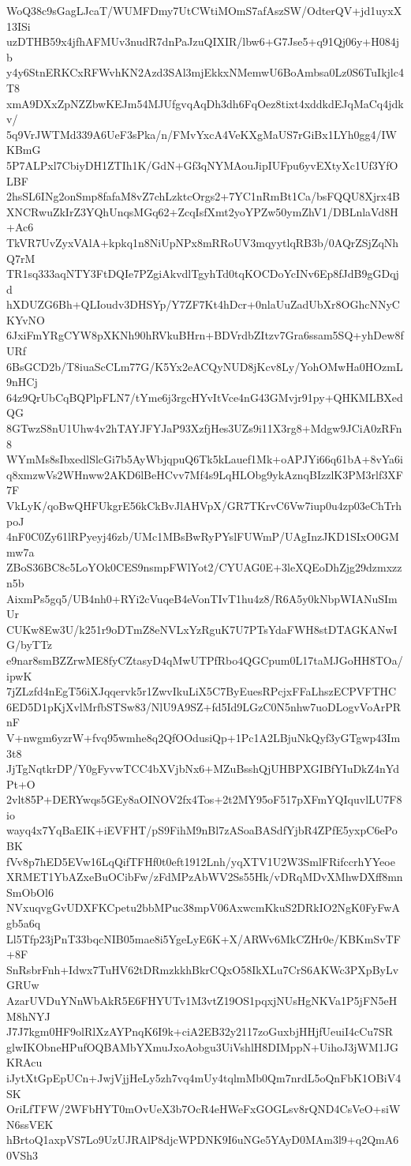 WoQ38c9sGagLJcaT/WUMFDmy7UtCWtiMOmS7afAszSW/OdterQV+jd1uyxX13ISi
uzDTHB59x4jfhAFMUv3nudR7dnPaJzuQIXIR/lbw6+G7Jse5+q91Qj06y+H084jb
y4y6StnERKCxRFWvhKN2Azd3SAl3mjEkkxNMemwU6BoAmbsa0Lz0S6TuIkjlc4T8
xmA9DXxZpNZZbwKEJm54MJUfgvqAqDh3dh6FqOez8tixt4xddkdEJqMaCq4jdkv/
5q9VrJWTMd339A6UeF3sPka/n/FMvYxcA4VeKXgMaUS7rGiBx1LYh0gg4/IWKBmG
5P7ALPxl7CbiyDH1ZTIh1K/GdN+Gf3qNYMAouJipIUFpu6yvEXtyXc1Uf3YfOLBF
2hsSL6INg2onSmp8fafaM8vZ7chLzktcOrgs2+7YC1nRmBt1Ca/bsFQQU8Xjrx4B
XNCRwuZkIrZ3YQhUnqsMGq62+ZcqIsfXmt2yoYPZw50ymZhV1/DBLnlaVd8H+Ac6
TkVR7UvZyxVAlA+kpkq1n8NiUpNPx8mRRoUV3mqyytlqRB3b/0AQrZSjZqNhQ7rM
TR1sq333aqNTY3FtDQIe7PZgiAkvdlTgyhTd0tqKOCDoYcINv6Ep8fJdB9gGDqjd
hXDUZG6Bh+QLIoudv3DHSYp/Y7ZF7Kt4hDcr+0nlaUuZadUbXr8OGhcNNyCKYvNO
6JxiFmYRgCYW8pXKNh90hRVkuBHrn+BDVrdbZItzv7Gra6ssam5SQ+yhDew8fURf
6BsGCD2b/T8iuaScCLm77G/K5Yx2eACQyNUD8jKcv8Ly/YohOMwHa0HOzmL9nHCj
64z9QrUbCqBQPlpFLN7/tYme6j3rgcHYvItVce4nG43GMvjr91py+QHKMLBXedQG
8GTwzS8nU1Uhw4v2hTAYJFYJaP93XzfjHes3UZs9i11X3rg8+Mdgw9JCiA0zRFn8
WYmMs8sIbxedlSlcGi7b5AyWbjqpuQ6Tk5kLauef1Mk+oAPJYi66q61bA+8vYa6i
q8xmzwVs2WHnww2AKD6lBeHCvv7Mf4s9LqHLObg9ykAznqBIzzlK3PM3rlf3XF7F
VkLyK/qoBwQHFUkgrE56kCkBvJlAHVpX/GR7TKrvC6Vw7iup0u4zp03eChTrhpoJ
4nF0C0Zy61lRPyeyj46zb/UMc1MBsBwRyPYslFUWmP/UAgInzJKD1SIxO0GMmw7a
ZBoS36BC8c5LoYOk0CES9nsmpFWlYot2/CYUAG0E+3leXQEoDhZjg29dzmxzzn5b
AixmPs5gq5/UB4nh0+RYi2cVuqeB4eVonTIvT1hu4z8/R6A5y0kNbpWIANuSImUr
CUKw8Ew3U/k251r9oDTmZ8eNVLxYzRguK7U7PTsYdaFWH8stDTAGKANwIG/byTTz
e9nar8smBZZrwME8fyCZtasyD4qMwUTPfRbo4QGCpum0L17taMJGoHH8TOa/ipwK
7jZLzfd4nEgT56iXJqqervk5r1ZwvIkuLiX5C7ByEuesRPcjxFFaLhszECPVFTHC
6ED5D1pKjXvlMrfbSTSw83/NlU9A9SZ+fd5Id9LGzC0N5nhw7uoDLogvVoArPRnF
V+nwgm6yzrW+fvq95wmhe8q2QfOOdusiQp+1Pc1A2LBjuNkQyf3yGTgwp43Im3t8
JjTgNqtkrDP/Y0gFyvwTCC4bXVjbNx6+MZuBsshQjUHBPXGIBfYIuDkZ4nYdPt+O
2vlt85P+DERYwqs5GEy8aOINOV2fx4Tos+2t2MY95oF517pXFmYQIquvlLU7F8io
wayq4x7YqBaEIK+iEVFHT/pS9FihM9nBl7zASoaBASdfYjbR4ZPfE5yxpC6ePoBK
fVv8p7hED5EVw16LqQifTFHf0t0eft1912Lnh/yqXTV1U2W3SmlFRifccrhYYeoe
XRMET1YbAZxeBuOCibFw/zFdMPzAbWV2Ss55Hk/vDRqMDvXMhwDXff8mnSmObOl6
NVxuqvgGvUDXFKCpetu2bbMPuc38mpV06AxwcmKkuS2DRkIO2NgK0FyFwAgb5a6q
Ll5Tfp23jPnT33bqcNIB05mae8i5YgeLyE6K+X/ARWv6MkCZHr0e/KBKmSvTF+8F
SnRsbrFnh+Idwx7TuHV62tDRmzkkhBkrCQxO58IkXLu7CrS6AKWc3PXpByLvGRUw
AzarUVDuYNnWbAkR5E6FHYUTv1M3vtZ19OS1pqxjNUsHgNKVa1P5jFN5eHM8hNYJ
J7J7kgm0HF9olRlXzAYPnqK6I9k+ciA2EB32y2117zoGuxbjHHjfUeuiI4cCu7SR
glwIKObneHPufOQBAMbYXmuJxoAobgu3UiVshlH8DIMppN+UihoJ3jWM1JGKRAcu
iJytXtGpEpUCn+JwjVjjHeLy5zh7vq4mUy4tqlmMb0Qm7nrdL5oQnFbK1OBiV4SK
OriLfTFW/2WFbHYT0mOvUeX3b7OcR4eHWeFxGOGLsv8rQND4CsVeO+siWN6ssVEK
hBrtoQ1axpVS7Lo9UzUJRAlP8djcWPDNK9I6uNGe5YAyD0MAm3l9+q2QmA60VSh3
